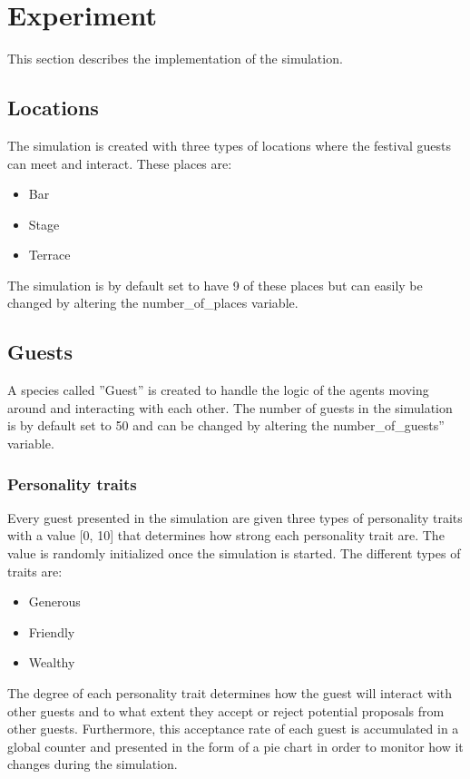 \documentclass[a4paper,10pt]{article}
\begin{document}
\clearpage
\maketitle

\section{Experiment}
This section describes the implementation of the simulation.

\maketitle
\subsection{Locations}
The simulation is created with three types of locations where the festival guests can meet and interact. These places are:

\begin{itemize}
    \item Bar
    \item Stage
    \item Terrace
    
\end{itemize}

The simulation is by default set to have 9 of these places but can easily be changed by altering the number\_of\_places variable. 

\subsection{Guests}
A species called ”Guest” is created to handle the logic of the agents moving around and interacting with each other. The number of guests in the simulation is by default set to 50 and can be changed by altering the number\_of\_guests” variable. 

\subsubsection{Personality traits}
Every guest presented in the simulation are given three types of personality traits with a value [0, 10] that determines how strong each personality trait are. The value is randomly initialized once the simulation is started. The different types of traits are:

\begin{itemize}
    \item Generous
    \item Friendly
    \item Wealthy
    
\end{itemize}
The degree of each personality trait determines how the guest will interact with other guests and to what extent they accept or reject potential proposals from other guests. Furthermore, this acceptance rate of each guest is accumulated in a global counter and presented in the form of a pie chart in order to monitor how it changes during the simulation. 
\end{document}
